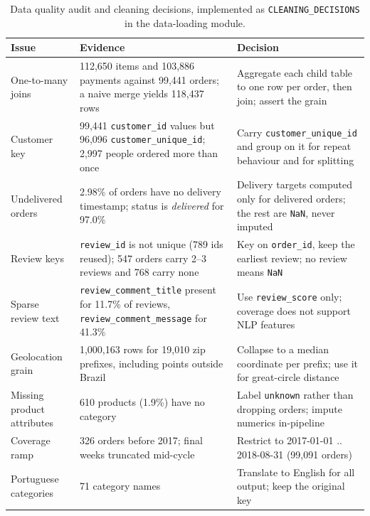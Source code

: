 \documentclass[11pt,a4paper]{article}
\newcommand{\code}[1]{\texttt{\small #1}}
\begin{document}
\begin{table}[htbp]
\centering
\caption{Data quality audit and cleaning decisions, implemented as
\code{CLEANING\_DECISIONS} in the data-loading module.}
\label{tab:quality}
\small
\begin{tabular}{@{}p{2.7cm}p{4.7cm}p{6.3cm}@{}}
\toprule
\textbf{Issue} & \textbf{Evidence} & \textbf{Decision} \\
\midrule
One-to-many joins &
112{,}650 items and 103{,}886 payments against 99{,}441 orders; a naive merge
yields 118{,}437 rows &
Aggregate each child table to one row per order, then join; assert the grain \\[3pt]

Customer key &
99{,}441 \code{customer\_id} values but 96{,}096 \code{customer\_unique\_id};
2{,}997 people ordered more than once &
Carry \code{customer\_unique\_id} and group on it for repeat behaviour and for
splitting \\[3pt]

Undelivered orders &
2.98\% of orders have no delivery timestamp; status is \emph{delivered} for
97.0\% &
Delivery targets computed only for delivered orders; the rest are \code{NaN},
never imputed \\[3pt]

Review keys &
\code{review\_id} is not unique (789 ids reused); 547 orders carry 2--3 reviews
and 768 carry none &
Key on \code{order\_id}, keep the earliest review; no review means \code{NaN} \\[3pt]

Sparse review text &
\code{review\_comment\_title} present for 11.7\% of reviews,
\code{review\_comment\_message} for 41.3\% &
Use \code{review\_score} only; coverage does not support NLP features \\[3pt]

Geolocation grain &
1{,}000{,}163 rows for 19{,}010 zip prefixes, including points outside Brazil &
Collapse to a median coordinate per prefix; use it for great-circle distance \\[3pt]

Missing product attributes &
610 products (1.9\%) have no category &
Label \code{unknown} rather than dropping orders; impute numerics in-pipeline \\[3pt]

Coverage ramp &
326 orders before 2017; final weeks truncated mid-cycle &
Restrict to 2017-01-01 .. 2018-08-31 (99{,}091 orders) \\[3pt]

Portuguese categories &
71 category names &
Translate to English for all output; keep the original key \\
\bottomrule
\end{tabular}
\end{table}
\end{document}
